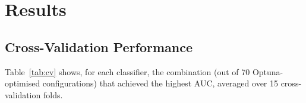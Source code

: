 \documentclass[a4paper,twoside]{article}
\begin{document}
\section{Results}
\label{sec:results}

\subsection{Cross-Validation Performance}

Table~\ref{tab:cv} shows, for each classifier, the combination (out of 70
Optuna-optimised configurations) that achieved the highest AUC, averaged over
15 cross-validation folds.

\begin{table}[ht!]
  \centering
  \caption{Best cross-validation results per classifier (Optuna, 70 combinations,
    15-fold repeated CV). Sensitivity and specificity are for the short-survival
    (positive) class. G-Mean $= \sqrt{\text{Sensitivity} \times \text{Specificity}}$.}
  \label{tab:cv}
\end{table}
\end{document}

